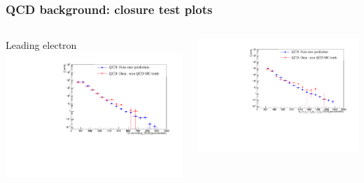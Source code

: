 \documentclass[bigger]{beamer}
\begin{document}
\begin{frame}
\frametitle{QCD background: closure test plots}
\label{sec-1-4-4}
\begin{columns}
\begin{column}{0.6\textwidth}
\label{sec-1-4-4-1}

\centering
Leading electron \pt
\includegraphics[width=\textwidth]{fig/qcd/closure_test/Pt1stEle_PAS.pdf}
\end{column}
\begin{column}{0.6\textwidth}
\label{sec-1-4-4-2}

\centering
\ST
\includegraphics[width=\textwidth]{fig/qcd/closure_test/sT_PAS.pdf}
\end{column}
\end{columns}
\end{frame}
\end{document}

